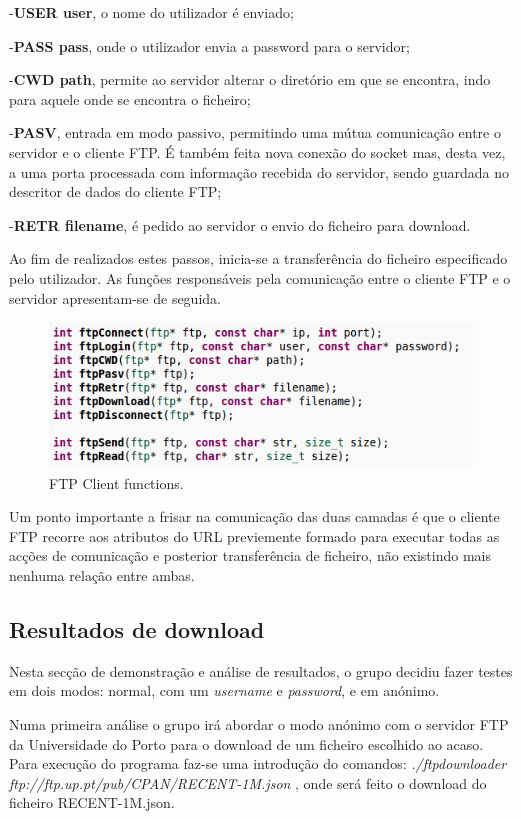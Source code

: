 \documentclass[a4paper]{article}
\begin{document}
 -\textbf{USER user}, o nome do utilizador é enviado;
 
 -\textbf{PASS pass}, onde o utilizador envia a password para o servidor;
 
 -\textbf{CWD path}, permite ao servidor alterar o diretório em que se encontra, indo para aquele onde se encontra o ficheiro;
 
 -\textbf{PASV}, entrada em modo passivo, permitindo uma mútua comunicação entre o servidor e o cliente FTP. É também feita nova conexão do socket mas, desta vez, a uma porta processada com informação recebida do servidor, sendo guardada no descritor de dados do cliente FTP;
 
 -\textbf{RETR filename}, é pedido ao servidor o envio do ficheiro para download.
 
Ao fim de realizados estes passos, inicia-se a transferência do ficheiro especificado pelo utilizador. As funções responsáveis pela comunicação entre o cliente FTP e o servidor apresentam-se de seguida.

\begin{figure}[h!]
\centering
\includegraphics[scale=0.5]{res/ftp-functions.png}
\caption{FTP Client functions.}
\end{figure}

Um ponto importante a frisar na comunicação das duas camadas é que o cliente FTP recorre aos atributos do URL previemente formado para executar todas as acções de comunicação e posterior transferência de ficheiro, não existindo mais nenhuma relação entre ambas.

\subsection{Resultados de download}
Nesta secção de demonstração e análise de resultados, o grupo decidiu fazer testes em dois modos: normal, com um \textit{username} e \textit{password}, e em anónimo.

Numa primeira análise o grupo irá abordar o modo anónimo com o servidor FTP da Universidade do Porto para o download de um ficheiro escolhido ao acaso.
Para execução do programa faz-se uma introdução do comandos:
\textit{./ftpdownloader ftp://ftp.up.pt/pub/CPAN/RECENT-1M.json} , onde será feito o download do ficheiro RECENT-1M.json.
\end{document}

